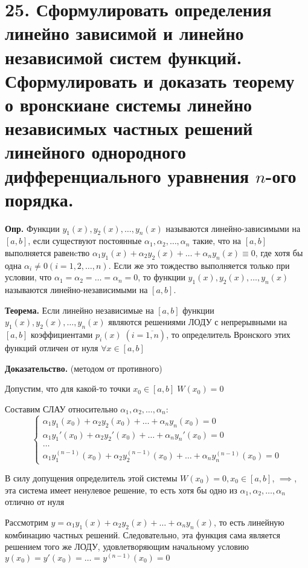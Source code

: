 \documentclass[11pt]{article}
\begin{document}
\section*{25. Сформулировать определения линейно зависимой и линейно независимой систем функций. Сформулировать и доказать теорему о вронскиане системы линейно независимых частных решений линейного однородного дифференциального уравнения $n$-ого порядка.}
\par\textbf{Опр.} Функции $y_{1}(x), y_{2}(x), \dots, y_{n}(x)$ называются линейно-зависимыми на $[a, b]$, если существуют постоянные $\alpha_{1}, \alpha_{2}, \dots, \alpha_{n}$ такие, что на $[a, b]$ выполняется равенcтво $\alpha_{1}y_{1}(x) + \alpha_{2}y_{2}(x) + \dots + \alpha_{n}y_{n}(x) \equiv 0$, где хотя бы одна $\alpha_{i} \neq 0(i = 1, 2, \dots, n)$. Если же это тождество выполняется только при условии, что $\alpha_{1} = \alpha_{2} = \dots = \alpha_{n} = 0$, то функции $y_{1}(x), y_{2}(x), \dots, y_{n}(x)$ называются линейно-независимыми на $[a, b]$.
\par\textbf{Теорема.} Если линейно независимые на $[a, b]$ функции $y_{1}(x), y_{2}(x), \dots, y_{n}(x)$ являются решениями ЛОДУ с непрерывными на $[a, b]$ коэффициентами $p_{i}(x) \; (i = \overline{1, n})$, то определитель Вронского этих функций отличен от нуля $\forall x \in [a, b]$
\par\textbf{Доказательство.} (методом от противного)
\par Допустим, что для какой-то точки $x_{0} \in [a, b] \; W(x_{0}) = 0$
\par Составим СЛАУ относительно $\alpha_{1}, \alpha_{2}, \dots, \alpha_{n}$:
$$\left\{\begin{array}{l}
\alpha_{1}y_{1}(x_{0}) + \alpha_{2}y_{2}(x_{0}) + \dots + \alpha_{n}y_{n}(x_{0}) = 0 \\
\alpha_{1}y_{1}'(x_{0}) + \alpha_{2}y_{2}'(x_{0}) + \dots + \alpha_{n}y_{n}'(x_{0}) = 0 \\
\dots \\
\alpha_{1}y_{1}^{(n-1)}(x_{0}) + \alpha_{2}y_{2}^{(n-1)}(x_{0}) + \dots + \alpha_{n}y_{n}^{(n-1)}(x_{0}) = 0
\end{array}\right.$$
\par В силу допущения определитель этой системы $W(x_0) = 0, x_{0} \in [a, b]$, $\implies$, эта система имеет ненулевое решение, то есть хотя бы одно из $\alpha_{1}, \alpha_{2}, \dots, \alpha_{n}$ отлично от нуля
\par Рассмотрим $y = \alpha_{1}y_{1}(x) + \alpha_{2}y_{2}(x) + \dots + \alpha_{n}y_{n}(x)$, то есть линейную комбинацию частных решений. Следовательно, эта функция сама является решением того же ЛОДУ, удовлетворяющим начальному условию $y(x_{0}) = y'(x_{0}) = \dots = y^{(n-1)}(x_{0}) = 0$
\end{document}
